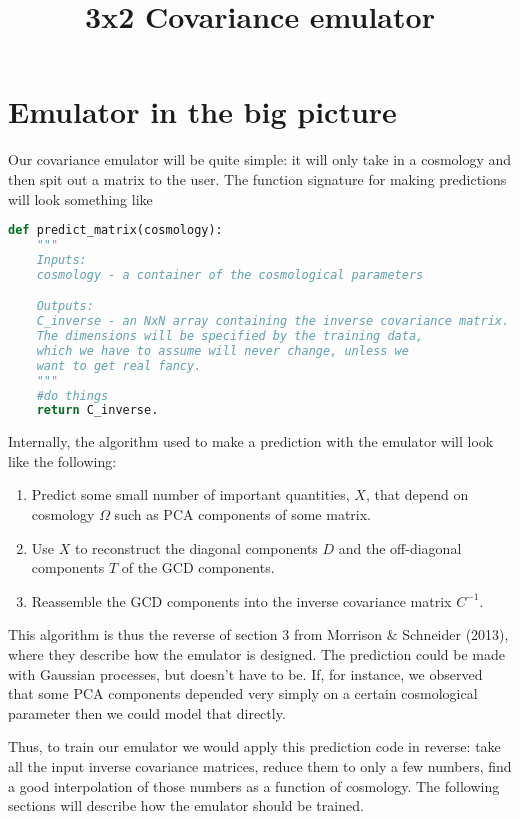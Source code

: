 \documentclass[11pt,twoside,a5paper]{article}
\begin{document}
\title{3x2 Covariance emulator}
\maketitle

\section{Emulator in the big picture}
Our covariance emulator will be quite simple: it will only take in a cosmology and then spit out a matrix to the user. The function signature for making predictions will look something like
\begin{lstlisting}[language=Python]
def predict_matrix(cosmology):
    """
    Inputs:
    cosmology - a container of the cosmological parameters

    Outputs:
    C_inverse - an NxN array containing the inverse covariance matrix. 
    The dimensions will be specified by the training data, 
    which we have to assume will never change, unless we 
    want to get real fancy.
    """
    #do things
    return C_inverse.
\end{lstlisting}
Internally, the algorithm used to make a prediction with the emulator will look like the following:
\begin{enumerate}
\item Predict some small number of important quantities, $X$, that depend on cosmology $\Omega$ such as PCA components of some matrix.
\item Use $X$ to reconstruct the diagonal components $D$ and the off-diagonal components $T$ of the GCD components.
\item Reassemble the GCD components into the inverse covariance matrix $C^{-1}$.
\end{enumerate}
This algorithm is thus the reverse of section 3 from Morrison \& Schneider (2013), where they describe how the emulator is designed. The prediction could be made with Gaussian processes, but doesn't have to be. If, for instance, we observed that some PCA components depended very simply on a certain cosmological parameter then we could model that directly.

Thus, to train our emulator we would apply this prediction code in reverse: take all the input inverse covariance matrices, reduce them to only a few numbers, find a good interpolation of those numbers as a function of cosmology. The following sections will describe how the emulator should be trained.
\end{document}
